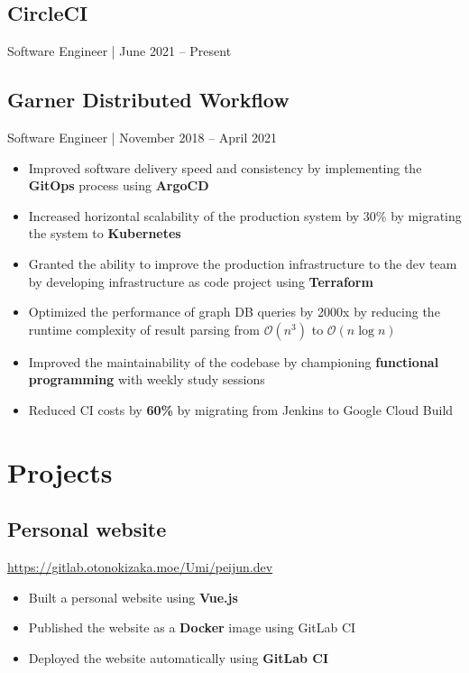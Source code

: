 \documentclass[letterpaper,12pt,oneside]{article}
\newcommand{\smallurl}[1]{\footnotesize{\url{#1}}\normalsize}
\begin{document}
\subsection*{CircleCI}
Software Engineer | June 2021 -- Present

\subsection*{Garner Distributed Workflow}
Software Engineer | November 2018 -- April 2021
\begin{itemize}
      \setlength\itemsep{0em}
      \item Improved software delivery speed and consistency by implementing the \textbf{GitOps} process using \textbf{ArgoCD}
      \item Increased horizontal scalability of the production system by 30\% by migrating the system to \textbf{Kubernetes}
      \item Granted the ability to improve the production infrastructure to the dev team by developing infrastructure as code project using \textbf{Terraform}
      \item Optimized the performance of graph DB queries by 2000x by reducing the runtime complexity of result parsing from $\mathcal{O}(n^3)$ to $\mathcal{O}(n\log{}n)$
      \item Improved the maintainability of the codebase by championing \textbf{functional programming} with weekly study sessions
      \item Reduced CI costs by \textbf{60\%} by migrating from Jenkins to Google Cloud Build
\end{itemize}

\section*{Projects}

\subsection*{Personal website \hfill {}}
\smallurl{https://gitlab.otonokizaka.moe/Umi/peijun.dev}
\begin{itemize}
      \setlength\itemsep{0em}
      \item Built a personal website using \textbf{Vue.js}
      \item Published the website as a \textbf{Docker} image using GitLab CI
      \item Deployed the website automatically using \textbf{GitLab CI}
\end{itemize}
\end{document}
